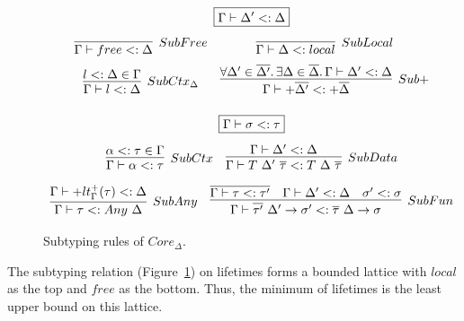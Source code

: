 \documentclass[11pt]{article}
\newcommand{\mathframebox}[1]{\framebox{$\displaystyle #1$}}
\newcommand{\ap}{~}
\begin{document}
    \begin{figure}
        \begin{gather*}
            \mathframebox{\Gamma\vdash\Delta' <: \Delta} \\[0.5em]
            \begin{array}{cc}
                \infer[SubFree]{\Gamma\vdash free <: \Delta}{} &
                \infer[SubLocal]{\Gamma\vdash\Delta <: local}{} \\[0.5em]
                \infer[SubCtx_\Delta]{
                    \Gamma\vdash l <: \Delta
                }{
                    l <: \Delta \in \Gamma
                } &
                \infer[Sub+]{
                    \Gamma\vdash+\overline{\Delta'} <: +\overline{\Delta}
                }{
                    \forall\Delta'\in\overline{\Delta'}\ldotp\exists\Delta\in\overline{\Delta}\ldotp \Gamma\vdash\Delta' <: \Delta
                }
            \end{array}\\[1em]
            \mathframebox{\Gamma\vdash \sigma <: \tau} \\[0.5em]
            \begin{array}{cc}
                \infer[SubCtx]{\Gamma\vdash \alpha <: \tau}{\alpha <: \tau \in \Gamma} &
                \infer[SubData]{
                    \Gamma\vdash T\ap\Delta'\ap\overline{\tau} <: T\ap\Delta\ap\overline{\tau}
                }{
                    \Gamma\vdash\Delta' <: \Delta
                }
            \end{array} \\[0.5em]
            \begin{array}{cc}
                \infer[SubAny]{
                    \Gamma\vdash \tau <: Any\ap\Delta
                }{
                    \Gamma\vdash +lt_\Gamma^+(\tau) <: \Delta
                } &
                \infer[SubFun]{
                    \Gamma\vdash\overline{\tau'}~\Delta'\to\sigma' <: \overline{\tau}~\Delta\to\sigma
                }{
                    \overline{\Gamma\vdash\tau <: \tau'} &
                    \Gamma\vdash\Delta' <: \Delta &
                    \sigma' <: \sigma
                }
            \end{array}
        \end{gather*}
        \caption{Subtyping rules of $Core_{\Delta}$.}
        \label{fig:core-subtyping}
    \end{figure}

    The subtyping relation (Figure\ \ref{fig:core-subtyping}) on lifetimes forms a bounded lattice with $local$ as the top and $free$ as the bottom.
    Thus, the minimum of lifetimes is the least upper bound on this lattice.
\end{document}
